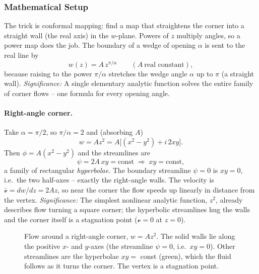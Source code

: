 \documentclass[../main.tex]{subfiles}
\begin{document}
\subsubsection*{Mathematical Setup}
The trick is conformal mapping: find a map that straightens the corner into a straight wall (the real axis) in the $w$-plane. Powers of $z$ multiply angles, so a power map does the job. The boundary of a wedge of opening $\alpha$ is sent to the real line by
\begin{equation}
  \boxed{w(z) = A\,z^{\pi/\alpha}}\qquad (A\ \text{real constant}),
  \label{eq:lec17_corner_w}
\end{equation}
because raising to the power $\pi/\alpha$ stretches the wedge angle $\alpha$ up to $\pi$ (a straight wall). \textit{Significance:} A single elementary analytic function solves the entire family of corner flows -- one formula for every opening angle.

\paragraph{Right-angle corner.} Take $\alpha=\pi/2$, so $\pi/\alpha=2$ and (absorbing $A$)
\begin{equation}
  w = A z^2 = A\big[(x^2-y^2) + i\,2xy\big].
  \label{eq:lec17_corner_square}
\end{equation}
Then $\phi=A(x^2-y^2)$ and the streamlines are
\begin{equation}
  \psi = 2A\,xy = \text{const}\;\Longrightarrow\; xy=\text{const},
  \label{eq:lec17_corner_streamlines}
\end{equation}
a family of rectangular \emph{hyperbolae}. The boundary streamline $\psi=0$ is $xy=0$, i.e.\ the two half-axes -- exactly the right-angle walls. The velocity is $\bar{\mathcal v}=dw/dz=2Az$, so near the corner the flow speeds up linearly in distance from the vertex. \textit{Significance:} The simplest nonlinear analytic function, $z^2$, already describes flow turning a square corner; the hyperbolic streamlines hug the walls and the corner itself is a stagnation point ($\mathcal v=0$ at $z=0$).

\begin{figure}[h]
\centering
{}
\caption{Flow around a right-angle corner, $w=Az^2$. The solid walls lie along the positive $x$- and $y$-axes (the streamline $\psi=0$, i.e.\ $xy=0$). Other streamlines are the hyperbolae $xy=$ const (green), which the fluid follows as it turns the corner. The vertex is a stagnation point.}
\label{fig:lec17_corner}
\end{figure}
\end{document}
